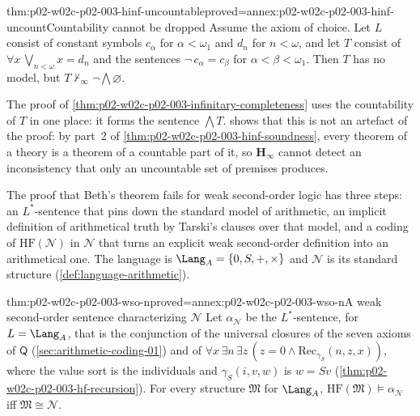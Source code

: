 \begin{hbtheorem}{thm:p02-w02c-p02-003-hinf-uncountable}{proved=annex:p02-w02c-p02-003-hinf-uncount}{Countability cannot be dropped}
Assume the axiom of choice.  Let \(L\) consist of constant symbols
\(c_\alpha\) for \(\alpha<\omega_1\) and \(d_n\) for \(n<\omega\), and let
\(T\) consist of \(\forall x\,\bigvee_{n<\omega}x=d_n\) and the sentences
\(\neg\,c_\alpha=c_\beta\) for \(\alpha<\beta<\omega_1\).  Then \(T\) has no
model, but \(T\nvdash_{\infty}\neg\bigwedge\varnothing\).
\end{hbtheorem}

The proof of \cref{thm:p02-w02c-p02-003-infinitary-completeness} uses
the countability of \(T\) in one place: it forms the sentence
\(\bigwedge T\).   shows that
this is not an artefact of the proof: by part~2 of
\cref{thm:p02-w02c-p02-003-hinf-soundness}, every theorem of a theory is a
theorem of a countable part of it, so \(\mathbf H_{\infty}\) cannot detect
an inconsistency that only an uncountable set of premises produces.

The proof that Beth's theorem fails for weak second-order logic has
three steps: an \(L^{*}\)-sentence that pins down the standard model of
arithmetic, an implicit definition of arithmetical truth by Tarski's
clauses over that model, and a coding of \(\mathrm{HF}(\mathcal N)\) in
\(\mathcal N\) that turns an explicit weak second-order definition into
an arithmetical one.  The language is \(\Lang_A=\{0,S,+,\times\}\) and \(\mathcal N\)
is its standard structure (\cref{def:language-arithmetic}).

\begin{hbtheorem}{thm:p02-w02c-p02-003-wso-n}{proved=annex:p02-w02c-p02-003-wso-n}{A weak second-order sentence characterizing \(\mathcal N\)}
Let \(\alpha_{\mathcal N}\) be the \(L^{*}\)-sentence, for \(L=\Lang_A\),
that is the conjunction of the universal closures of the seven axioms of
\(\mathsf Q\) (\cref{sec:arithmetic-coding-01}) and of
\(\forall x\,\exists n\,\exists z\,(z=0\land\mathrm{Rec}_{\gamma_S}(n,z,x))\),
where the value sort is the individuals and \(\gamma_S(i,v,w)\) is
\(w=Sv\) (\cref{thm:p02-w02c-p02-003-hf-recursion}).  For every structure
\(\mathfrak M\) for \(\Lang_A\),
\(\mathrm{HF}(\mathfrak M)\models\alpha_{\mathcal N}\) iff
\(\mathfrak M\cong\mathcal N\).
\end{hbtheorem}


